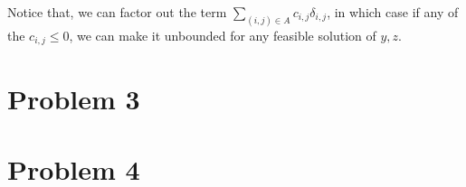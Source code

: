 \documentclass[]{article}
\theoremstyle{definition}
\begin{document}
        Notice that, we can factor out the term $\sum_{(i, j)\in A}c_{i, j}\delta_{i, j}$, in which case if any of the $c_{i, j}\le 0$, we can make it unbounded for any feasible solution of $y, z$. 
        

\section{Problem 3}

\section{Problem 4}
\end{document}
